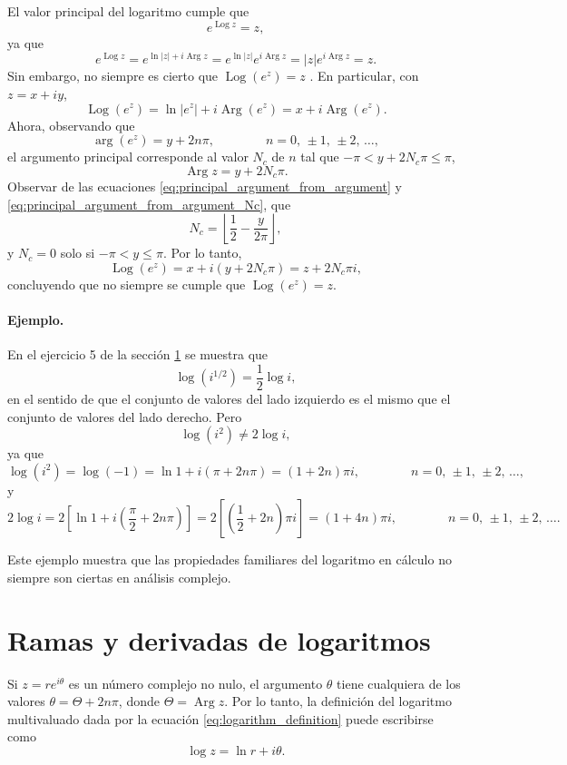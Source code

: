 \documentclass[a4paper]{report}
\DeclareMathOperator{\Arg}{Arg}
\DeclareMathOperator{\Log}{Log}
\begin{document}
El valor principal del logaritmo cumple que
\[
 e^{\Log z}=z,
\]
ya que 
\[
 e^{\Log z}=e^{\ln|z|+i\Arg z}=e^{\ln|z|}e^{i\Arg z}=|z|e^{i\Arg z}=z.
\]
Sin embargo, no siempre es cierto que \(\Log(e^z)=z\) \cite{haber2019complex}. En particular, con \(z=x+iy\),
\[
 \Log(e^z)=\ln|e^z|+i\Arg(e^z)=x+i\Arg(e^z).
\]
Ahora, observando que 
\[
 \arg(e^z)=y+2n\pi,
 \qquad\qquad n=0,\,\pm1,\,\pm2,\,\dots, 
\]
el argumento principal corresponde al valor \(N_c\) de \(n\) tal que \(-\pi<y+2N_c\pi\leq\pi\),
\[
 \Arg z=y+2N_c\pi.
\]
Observar de las ecuaciones \ref{eq:principal_argument_from_argument} y \ref{eq:principal_argument_from_argument_Nc}, que 
\begin{equation}\label{eq:logarithm_pv_of_exponential_Nc}
 N_c=\left\lfloor\frac{1}{2}-\frac{y}{2\pi}\right\rfloor, 
\end{equation}
y \(N_c=0\) solo si \(-\pi<y\leq\pi\).
Por lo tanto,
\begin{equation}\label{eq:logarithm_pv_of_exponential}
 \Log(e^z)=x+i(y+2N_c\pi)=z+2N_c\pi i,
\end{equation}
concluyendo que no siempre se cumple que \(\Log(e^z)=z\).

\paragraph{Ejemplo.} En el ejercicio 5 de la sección \ref{sec:logarithm_branches} se muestra que 
\[
 \log(i^{1/2})=\frac{1}{2}\log i,
\]
en el sentido de que el conjunto de valores del lado izquierdo es el mismo que el conjunto de valores del lado derecho. Pero
\[
 \log(i^2)\neq2\log i,
\]
ya que
\[
 \log(i^2)=\log(-1)=\ln1+i(\pi+2n\pi)=(1+2n)\pi i,\qquad\qquad n=0,\,\pm1,\,\pm2,\,\dots,
\]
y
\[
 2\log i=2\left[\ln1+i\left(\frac{\pi}{2}+2n\pi\right)\right]=2\left[\left(\frac{1}{2}+2n\right)\pi i\right]=(1+4n)\pi i,\qquad\qquad n=0,\,\pm1,\,\pm2,\,\dots.
\]

Este ejemplo muestra que las propiedades familiares del logaritmo en cálculo no siempre son ciertas en análisis complejo.

\section{Ramas y derivadas de logaritmos}\label{sec:logarithm_branches}

Si \(z=re^{i\theta}\) es un número complejo no nulo, el argumento \(\theta\) tiene cualquiera de los valores \(\theta=\Theta+2n\pi\), donde \(\Theta=\Arg z\). Por lo tanto, la definición del logaritmo multivaluado dada por la ecuación \ref{eq:logarithm_definition} puede escribirse como
\begin{equation}\label{eq:logarithm_definition_theta}
 \log z=\ln r+i\theta. 
\end{equation}
\end{document}
